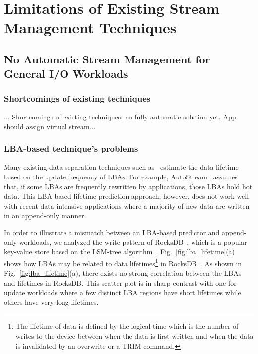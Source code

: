 \section{Limitations of Existing Stream Management Techniques}
\subsection{No Automatic Stream Management for General I/O Workloads}

\subsubsection{Shortcomings of existing techniques}
 ... Shortcomings of existing techniques: no fully automatic solution yet.  App should assign virtual stream...


\subsubsection{LBA-based technique's problems}
Many existing data separation techniques such as~\cite{AutoStream, HotCold} 
estimate the data lifetime based on the update frequency of LBAs.  
For example, \textsf{\small AutoStream}~\cite{AutoStream} assumes that, if
some LBAs are frequently rewritten by applications, those LBAs hold hot data.
This LBA-based lifetime prediction 
approach, however, does not work well with recent data-intensive 
applications where a majority of
new data are written in an append-only manner.  

In order to illustrate a mismatch between an LBA-based predictor and 
append-only workloads, we analyzed the write pattern of 
RocksDB~\cite{RocksDB}, which is a
popular key-value store based on the LSM-tree algorithm~\cite{LSM}.
Fig.~\ref{fig:lba_lifetime}(a) shows how LBAs may be related 
to data lifetimes\footnote{The lifetime of data is defined 
by the logical time which is the number of writes to the device 
between when the data is first written 
and when the data is invalidated by an overwrite or a TRIM command.}
in RocksDB~\cite{RocksDB}.  
As shown in Fig.~\ref{fig:lba_lifetime}(a), 
there exists no strong correlation between the LBAs and lifetimes in RocksDB.  
This scatter plot is in sharp contrast with one for update workloads 
where a few distinct LBA regions have short lifetimes while others 
have very long lifetimes.

